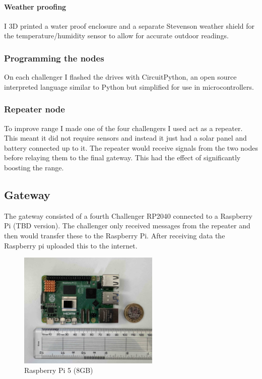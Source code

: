 \paragraph{Weather proofing}

I 3D printed a water proof enclosure and a separate Stevenson weather shield for
the temperature/humidity sensor to allow for accurate outdoor readings.

\subsubsection{Programming the nodes}

On each challenger I flashed the drives with CircuitPython, an open source
interpreted language similar to Python but simplified for use in
microcontrollers.

\subsubsection{Repeater node}

To improve range I made one of the four challengers I used act as a repeater.
This meant it did not require sensors and instead it just had a solar panel and
battery connected up to it. The repeater would receive signals from the two
nodes before relaying them to the final gateway. This had the effect of
significantly boosting the range.

\subsection{Gateway}

The gateway consisted of a fourth Challenger RP2040 connected to a Raspberry Pi
(TBD version). The challenger only received messages from the repeater and then
would transfer these to the Raspberry Pi. After receiving data the Raspberry pi
uploaded this to the internet.

\begin{figure}[H]
    \centering
    \includegraphics[width=0.6\textwidth]{contents/part-2/fig2/raspberry-pi.jpg}
    \caption{Raspberry Pi 5 (8GB)}
    \label{fig:raspberry-pi}
\end{figure}

